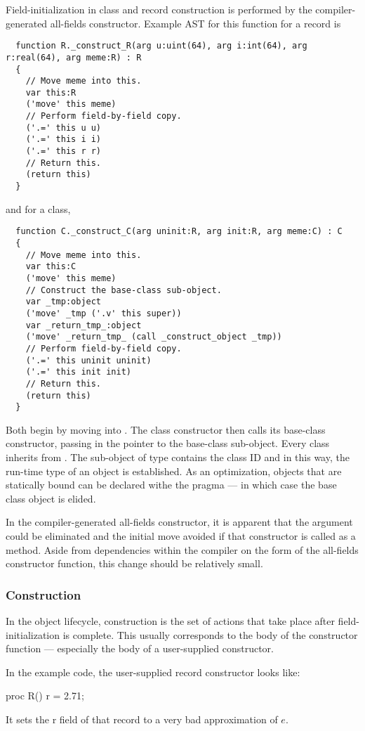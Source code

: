 Field-initialization in class and record construction is performed by the
compiler-generated all-fields constructor.  Example AST for this function for a record is
\begin{verbatim}
  function R._construct_R(arg u:uint(64), arg i:int(64), arg r:real(64), arg meme:R) : R
  {
    // Move meme into this.
    var this:R
    ('move' this meme)
    // Perform field-by-field copy.
    ('.=' this u u)
    ('.=' this i i)
    ('.=' this r r)
    // Return this.
    (return this)
  }
\end{verbatim}
and for a class,
\begin{verbatim}
  function C._construct_C(arg uninit:R, arg init:R, arg meme:C) : C
  {
    // Move meme into this.
    var this:C
    ('move' this meme)
    // Construct the base-class sub-object.
    var _tmp:object
    ('move' _tmp ('.v' this super))
    var _return_tmp_:object
    ('move' _return_tmp_ (call _construct_object _tmp))
    // Perform field-by-field copy.
    ('.=' this uninit uninit)
    ('.=' this init init)
    // Return this.
    (return this)
  }
\end{verbatim}
Both begin by moving  into .  The class constructor then calls its
base-class constructor, passing in the pointer to the base-class sub-object.  Every class
inherits from .  The sub-object of type  contains the class ID
and in this way, the run-time type of an object is established.  As an optimization,
objects that are statically bound can be declared withe the  pragma ---
in which case the  base class object is elided.

In the compiler-generated all-fields constructor, it is apparent that the 
argument could be eliminated and the initial move avoided if that constructor is called as
a method.  Aside from dependencies within the compiler on the form of the all-fields
constructor function, this change should be relatively small.

\subsubsection{Construction}

In the object lifecycle, construction is the set of actions that take place after
field-initialization is complete.  This usually corresponds to the body of the constructor
function --- especially the body of a user-supplied constructor.

In the example code, the user-supplied record constructor looks like:
\begin{chapel}
  proc R() { r = 2.71; }
\end{chapel}
It sets the r field of that record to a very bad approximation of $e$.

